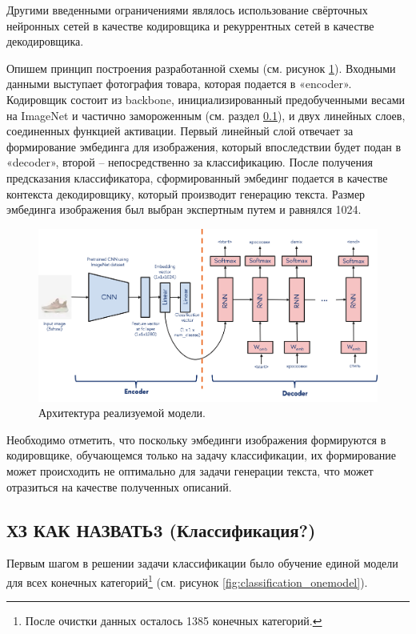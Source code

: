 \documentclass[a4paper,12pt]{extarticle}
\begin{document}
Другими введенными ограничениями являлось использование свёрточных нейронных сетей в качестве кодировщика и рекуррентных сетей в качестве декодировщика.

Опишем принцип построения разработанной схемы (см. рисунок \ref{fig:general_scheme}). Входными данными выступает фотография товара, которая подается в «encoder». Кодировщик состоит из backbone, инициализированный предобученными весами на ImageNet и частично замороженным (см. раздел \ref{subsection:results-classification}), и двух линейных слоев, соединенных функцией активации. Первый линейный слой отвечает за формирование эмбединга для изображения, который впоследствии будет подан в «decoder», второй – непосредственно за классификацию. После получения предсказания классификатора, сформированный эмбединг подается в качестве контекста декодировщику, который производит генерацию текста. Размер эмбединга изображения был выбран экспертным путем и равнялся 1024.

\begin{figure}[ht]
	\centering
	\includegraphics[scale=0.55]{general_scheme.png}
	\caption{Архитектура реализуемой модели.}
	\label{fig:general_scheme}
\end{figure}

Необходимо отметить, что поскольку эмбединги изображения формируются в кодировщике, обучающемся только на задачу классификации, их формирование может происходить не оптимально для задачи генерации текста, что может отразиться на качестве полученных описаний.

\subsection{ХЗ КАК НАЗВАТЬ3 (Классификация?)}\label{subsection:results-classification}

Первым шагом в решении задачи классификации было обучение единой модели для всех конечных категорий\footnote{После очистки данных осталось 1385 конечных категорий.} (см. рисунок \ref{fig:classification_onemodel}). 
\end{document}
